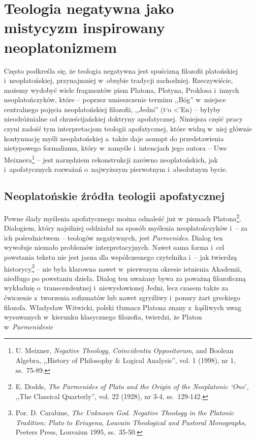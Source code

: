 

\chapter{Teologia negatywna jako mistycyzm inspirowany neoplatonizmem}

Często podkreśla się, że teologia negatywna jest spuścizną filozofii platońskiej i~neoplatońskiej, przynajmniej w~obrębie tradycji zachodniej. Rzeczywiście, możemy wydobyć wiele fragmentów pism Platona, Plotyna, Proklosa i~innych neoplatończyków, które -- poprzez umieszczenie terminu ,,Bóg'' w~miejsce centralnego pojęcia neoplatońskiej filozofii, ,,Jedni'' (\textgreek{t`o <'En}) -- byłyby nieodróżnialne od chrześcijańskiej doktryny apofatycznej. Niniejsza część pracy czyni zadość tym interpretacjom teologii apofatycznej, które widzą w~niej głównie kontynuację myśli neoplatońskiej a~także daje asumpt do przedstawienia nietypowego formalizmu, który w~zamyśle i~intencjach jego autora -- Uwe Meixnera\footnote{U. Meixner, \textit{Negative Theology, Coincidentia Oppositorum}, and Boolean Algebra, ,,History of Philosophy \& Logical Analysis'', vol. 1 (1998), nr 1, ss.~75-89.} -- jest narzędziem rekonstrukcji zarówno neoplatońskich, jak i~apofatycznych rozważań o~najwyższym pierwotnym i~absolutnym bycie.

\section{Neoplatońskie źródła teologii apofatycznej}

Pewne ślady myślenia apofatycznego można odnaleźć już w~pismach Platona\footnote{E. Dodds, \textit{The Parmenides of Plato and the Origin of the Neoplatonic ‘One}', ,,The Classical Quarterly'', vol. 22 (1928), nr 3-4, ss.~129-142.}. Dialogiem, który najsilniej oddziałał na sposób myślenia neoplatończyków i~-- za ich pośrednictwem -- teologów negatywnych, jest \textit{Parmenides}. Dialog ten wywołuje niemało problemów interpretacyjnych. Nawet sama forma i~cel powstania tekstu nie jest jasna dla współczesnego czytelnika i~-- jak twierdzą historycy\footnote{Por. D. Carabine, \textit{The Unknown God. Negative Theology in the Platonic Tradition: Plato to Eriugena}, \textit{Louvain Theological and Pastoral Monographs}, Peeters Press, Louvaiun 1995, ss.~35-50.} -- nie była klarowna nawet w~pierwszym okresie istnienia Akademii, niedługo po powstaniu dzieła. Dialog ten uważany bywa za poważną filozoficzną wykładnię o~transcendentnej i~niewysłowionej Jedni, lecz czasem także za ćwiczenie z~tworzenia sofizmatów lub nawet zgryźliwy i~ponury żart greckiego filozofa. Władysław Witwicki, polski tłumacz Platona znany z~kąśliwych uwag wysuwanych w~kierunku klasycznego filozofia, twierdzi, że Platon w~\textit{Parmenidesie}

